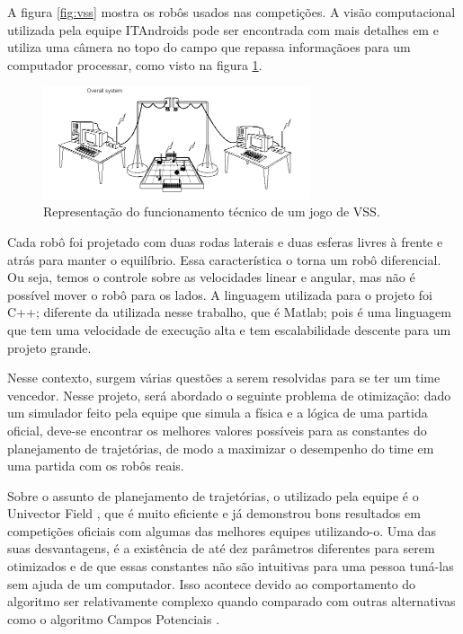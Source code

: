 \documentclass[a4paper,12pt]{article}
\begin{document}
A figura \ref{fig:vss} mostra os robôs usados nas competições. A visão computacional utilizada pela equipe ITAndroids pode ser encontrada com mais detalhes em \cite{small_vision} e utiliza uma câmera no topo do campo que repassa informaçãoes para um computador processar, como visto na figura \ref{fig:funcioamento}.

\begin{figure}[H]
	\centering
		\includegraphics[width=0.7\textwidth]{figures/overview.png}
  \caption{Representação do funcionamento técnico de um jogo de VSS.}
	\label{fig:funcioamento}
\end{figure}

Cada robô foi projetado com duas rodas laterais e duas esferas livres à frente e atrás para manter o equilíbrio. Essa característica o torna um robô diferencial. Ou seja, temos o controle sobre as velocidades linear e angular, mas não é possível mover o robô para os lados. A linguagem utilizada para o projeto foi C++; diferente da utilizada nesse trabalho, que é Matlab; pois é uma linguagem que tem uma velocidade de execução alta e tem escalabilidade descente para um projeto grande. 

Nesse contexto, surgem várias questões a serem resolvidas para se ter um time vencedor. Nesse projeto, será abordado o seguinte problema de otimização: dado um simulador feito pela equipe que simula a física e a lógica de uma partida oficial, deve-se encontrar os melhores valores possíveis para as constantes do planejamento de trajetórias, de modo a maximizar o desempenho do time em uma partida com os robôs reais.

Sobre o assunto de planejamento de trajetórias, o utilizado pela equipe é o Univector Field \cite{univector}, que é muito eficiente e já demonstrou bons resultados em competições oficiais com algumas das melhores equipes utilizando-o. Uma das suas desvantagens, é a existência de até dez parâmetros diferentes para serem otimizados e de que essas constantes não são intuitivas para uma pessoa tuná-las sem ajuda de um computador. Isso acontece devido ao comportamento do algoritmo ser relativamente complexo quando comparado com outras alternativas como o algoritmo Campos Potenciais \cite{potential_fields}.
\end{document}
